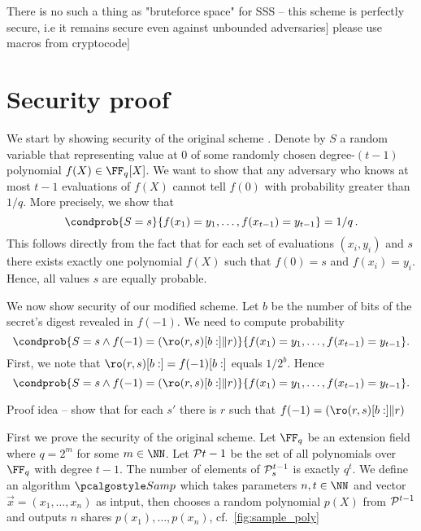\documentclass[envcountsame,runningheads,notitlepage]{llncs}
\DeclareRobustCommand{\michals}[2] {{\color{magenta}{$\big[$\scriptsize\textsf{Michal #1:}} #2$\big]$}}
\begin{document}
	
	\michals{13.03}{There is no such a thing as "bruteforce space" for SSS -- this scheme is perfectly secure, i.e it remains secure even against unbounded adversaries}
	\michals{13.03.22}{please use macros from cryptocode}
	
	\section{Security proof}

	We start by showing security of the original scheme \cite{Shamir79}. Denote by $S$ a random variable that representing value at $0$ of some randomly chosen degree-$(t - 1)$ polynomial $f (X) \in \FF_q [X]$. We want to show that any adversary who knows at most $t - 1$ evaluations of $f (X)$ cannot tell $f (0)$ with probability greater than $1 / q$. More precisely, we show that 
	\[ 
		\condprob{S = s}{f(x_1) = y_1, \ldots, f(x_{t - 1}) = y_{t - 1}} = 1/q\,.
	\] 
	This follows directly from the fact that for each set of evaluations $(x_i, y_i)$ and $s$ there exists exactly one polynomial $f (X)$ such that $f(0) = s$ and $f(x_i) = y_i$. Hence, all values $s$ are equally probable.

	We now show security of our modified scheme. Let $b$ be the number of bits of the secret's digest revealed in $f(-1)$. We need to compute probability
	\[ 
		\condprob{S = s \land f(-1) = (\ro(r, s)[b:] \| r)}{f(x_1) = y_1, \ldots, f(x_{t - 1}) = y_{t - 1}}.
	\] 
	First, we note that $\ro (r, s)[b:] = f(-1)[b:]$ equals $1/2^{b}$. Hence
	\[
		\condprob{S = s \land f(-1) = (\ro(r, s)[b:] \| r)}{f(x_1) = y_1, \ldots, f(x_{t - 1}) = y_{t - 1}}.
	\] 

	Proof idea -- show that for each $s'$ there is $r$ such that $f(-1) = (\ro(r, s)[b:] \| r)$

	First we prove the security of the original scheme.	Let $\FF_{q}$ be an extension field where $q = 2^{m}$ for some $m \in \NN$. Let ${\mathcal P}{t - 1}$ be the set of all polynomials over $\FF_{q}$ with degree $t - 1$. The number of elements of ${\mathcal P}_{s}^{t - 1}$ is exactly $q^{t}$. 
	We define an algorithm $\samplePoly$ which takes parameters $n, t \in \NN$ and vector $\vec{x} = (x_1, \ldots, x_n)$ as intput, then chooses a random polynomial $p(X)$ from ${\mathcal P}^{t - 1}$ and outputs $n$ shares $p(x_1), \ldots, p(x_n)$, cf.~\cref{fig:sample_poly}
	
\end{document}
